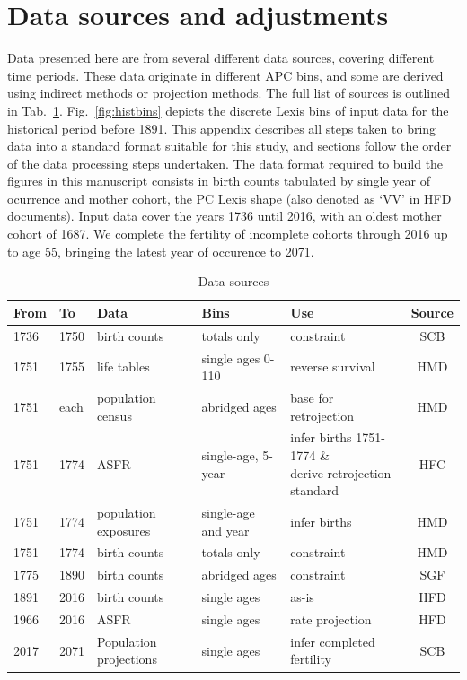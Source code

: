 
\section{Data sources and adjustments}
\label{sec:dataprep}
Data presented here are from several different data sources, covering different time periods. These data originate in different APC bins, and some are derived using indirect methods or projection methods. The full list of sources is outlined in Tab.~\ref{app:sources}. Fig.~\ref{fig:histbins} depicts the discrete Lexis bins of input data for the historical period before 1891. This appendix describes all steps taken to bring data into a standard format suitable for this study, and sections follow the order of the data processing steps undertaken. The data format required to build the figures in this manuscript consists in birth counts tabulated by single year of ocurrence and mother cohort, the PC Lexis shape (also denoted as `VV' in HFD documents). Input data cover the years 1736 until 2016, with an oldest mother cohort of 1687. We complete the fertility of incomplete cohorts through 2016 up to age 55, bringing the latest year of occurence to 2071.

\begin{table}[ht]
\begin{tabular}{lllllc}
From & To & Data & Bins & Use & Source \\ \hline
1736 & 1750 & birth counts & totals only & constraint & SCB \\
1751 & 1755 & life tables & single ages 0-110 & reverse survival & HMD \\
1751 & each & population census & abridged ages & base for retrojection & HMD \\
1751 & 1774 & ASFR & single-age, 5-year & \makecell{infer births 1751-1774 \&\\ derive retrojection standard} & HFC \\
1751 & 1774 & population exposures & single-age and year & infer births & HMD \\
1751 & 1774 & birth counts & totals only & constraint & HMD \\
1775 & 1890 & birth counts & abridged ages & constraint & SGF \\
1891 & 2016 & birth counts & single ages & as-is & HFD \\
1966 & 2016 & ASFR & single ages & rate projection & HFD \\
2017 & 2071 & Population projections & single ages & infer completed fertility & SCB
\end{tabular}
\caption{Data sources}
\label{app:sources}
\end{table}

